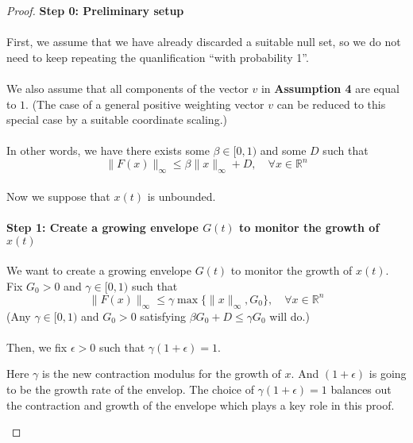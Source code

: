\begin{proof}
\textbf{Step 0: Preliminary setup}\\
\\
First, we assume that we have already discarded a suitable null set, so we do not need to keep repeating the quanlification ``with probability 1''.\\
\\
We also assume that all components of the vector $v$ in \textbf{Assumption 4} are equal to $1$. (The case of a general positive weighting vector $v$ can be reduced to this special case by a suitable coordinate scaling.)\\
\\
In other words, we have there exists some $\beta\in [0,1)$ and some $D$ such that 
$$
\|F(x)\|_\infty \le \beta\|x\|_\infty  + D,\quad \forall x\in\mathbb{R}^n
$$
\\
Now we suppose that $x(t)$ is unbounded.\\
\\
\textbf{Step 1: Create a growing envelope $G(t)$ to monitor the growth of $x(t)$}\\
\\
We want to create a growing envelope $G(t)$ to monitor the growth of $x(t)$. Fix $G_0>0$ and $\gamma\in[0,1)$ such that
\begin{equation}\label{eq:Fandgamma}
    \|F(x)\|_\infty  \le \gamma \max\{\|x\|_\infty, G_0\},\quad\forall x\in\mathbb{R}^n
\end{equation}
(Any $\gamma\in[0,1)$ and $G_0>0$ satisfying $\beta G_0+D\le \gamma G_0$ will do.)\\
\\
Then, we fix $\epsilon>0$ such that $\gamma(1+\epsilon)=1$.
\begin{remark}
    Here $\gamma$ is the new contraction modulus for the growth of $x$. And $(1+\epsilon)$ is going to be the growth rate of the envelop. The choice of $\gamma(1+\epsilon)=1$ balances out the contraction and growth of the envelope which plays a key role in this proof.
\end{remark}


\end{proof}
